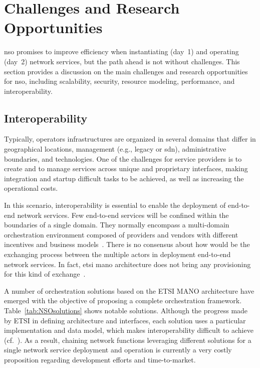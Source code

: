 \section{Challenges and Research Opportunities}
\label{sec:challenge}

\gls{nso} promises to improve efficiency when instantiating (day~1) and operating (day~2) network services, but the path ahead is not without  challenges. 
This section provides a discussion on the main challenges and research opportunities for \gls{nso}, including scalability, security, resource modeling, performance, and interoperability.

\subsection{Interoperability}

Typically, operators infrastructures are organized in several domains that differ in geographical locations, management (e.g., legacy or \gls{sdn}), administrative boundaries, and technologies. One of the challenges for service providers is to create and to manage services across unique and proprietary interfaces, making integration and startup difficult tasks to be achieved, as well as increasing the operational costs.  
 
In this scenario, interoperability is essential to enable the deployment of end-to-end network services. Few end-to-end services will be confined within the boundaries of a single domain. They normally encompass a multi-domain orchestration environment composed of providers and vendors with different incentives and business models~\cite{Katsalis2016Multi-DomainDirections}. There is no consensus about how would be the exchanging process between the multiple actors in deployment end-to-end network services. In fact, \gls{etsi} \gls{mano} architecture does not bring any provisioning for this kind of exchange~\cite{ETSIIndustrySpecificationGroupISGNFV2014NetworkNFV}. 

A number of orchestration solutions based on the ETSI MANO architecture have emerged with the objective of proposing a complete orchestration framework. Table~\ref{tab:NSOsolutions} shows notable solutions. Although the progress made by ETSI in defining architecture and interfaces, each solution uses a particular implementation and data model, which makes interoperability difficult to achieve (cf.~\cite{NOn}). As a result, chaining network functions leveraging different solutions for a single network service deployment and operation is currently a very costly proposition regarding development efforts and time-to-market.   

